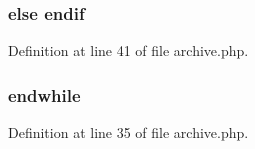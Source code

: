 \subsubsection[{endif}]{\setlength{\rightskip}{0pt plus 5cm}else endif}\label{archive_8php_ab4d017bcc79cd2827c3dce8af2570e91}


Definition at line 41 of file archive.\+php.

\hypertarget{archive_8php_a1b05dae45f9e3f4c1fe86048550d2c5b}{}
\subsubsection[{endwhile}]{\setlength{\rightskip}{0pt plus 5cm}endwhile}\label{archive_8php_a1b05dae45f9e3f4c1fe86048550d2c5b}


Definition at line 35 of file archive.\+php.

